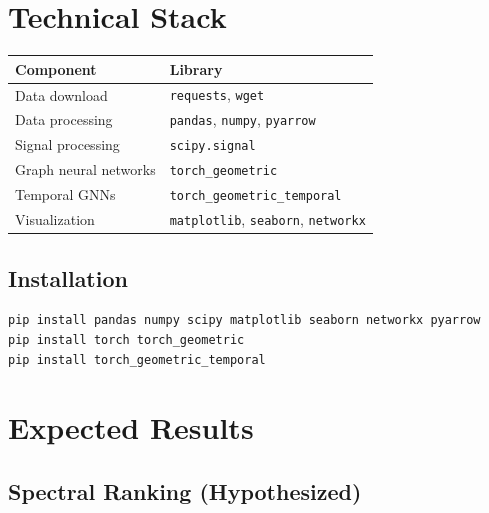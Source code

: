 \documentclass[11pt, a4paper]{article}
\begin{document}
\section{Technical Stack}

\begin{center}
\begin{tabular}{ll}
\toprule
\textbf{Component} & \textbf{Library} \\
\midrule
Data download & \texttt{requests}, \texttt{wget} \\
Data processing & \texttt{pandas}, \texttt{numpy}, \texttt{pyarrow} \\
Signal processing & \texttt{scipy.signal} \\
Graph neural networks & \texttt{torch\_geometric} \\
Temporal GNNs & \texttt{torch\_geometric\_temporal} \\
Visualization & \texttt{matplotlib}, \texttt{seaborn}, \texttt{networkx} \\
\bottomrule
\end{tabular}
\end{center}

\subsection{Installation}

\begin{lstlisting}[language=bash]
pip install pandas numpy scipy matplotlib seaborn networkx pyarrow
pip install torch torch_geometric
pip install torch_geometric_temporal
\end{lstlisting}

\section{Expected Results}

\subsection{Spectral Ranking (Hypothesized)}
\end{document}
